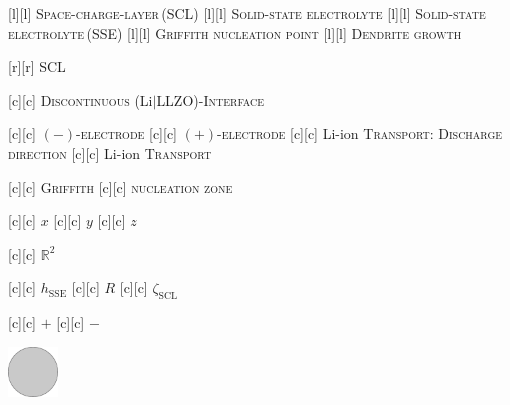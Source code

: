 [l][l] {\scriptsize \textsc{Space-charge-layer\,(SCL)}}
[l][l]  {\scriptsize \textsc{Solid-state electrolyte}}
[l][l]  {\scriptsize \textsc{Solid-state electrolyte\,(SSE)}}
[l][l] {\scriptsize \textsc{Griffith nucleation point}}
[l][l] {\scriptsize \textsc{Dendrite growth}}

[r][r]  {\tiny \textsc{SCL}}

[c][c] {\scriptsize \textsc{Discontinuous} (Li$|$LLZO)-\textsc{Interface}}

[c][c] {\scriptsize $(-)$-\textsc{electrode}}
[c][c] {\scriptsize $(+)$-\textsc{electrode}}
[c][c] {\scriptsize Li-ion \textsc{Transport}: \textsc{Discharge direction}}
[c][c] {\scriptsize Li-ion \textsc{Transport}}

[c][c]   {\scriptsize \textsc{Griffith}}
[c][c] {\scriptsize \textsc{nucleation zone}}

[c][c] {\scriptsize $x$}
[c][c] {\scriptsize $y$}
[c][c] {\scriptsize $z$}

[c][c] {\scriptsize $\mathbb{R}^{2}$}

[c][c]  {\scriptsize $h_{\text{SSE}}$}
[c][c] {\scriptsize $R$}
[c][c] {\scriptsize $\zeta_{\text{SCL}}$}

[c][c]  {\tiny $+$}
[c][c]  {\tiny $-$}

\includegraphics[width=0.1\textwidth]{semiconductorBA.eps}